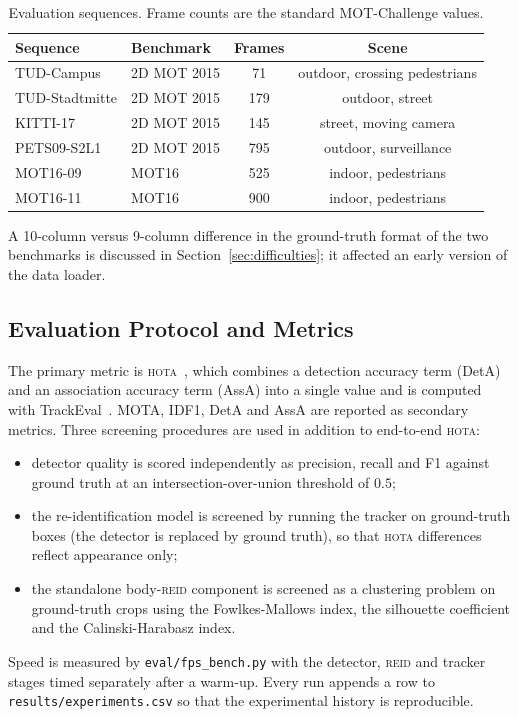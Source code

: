 \documentclass[12pt, a4paper]{article}
\newcommand{\hota}{\textsc{hota}}
\newcommand{\reid}{\textsc{reid}}
\begin{document}
\begin{table}[H]
\centering
\caption{Evaluation sequences. Frame counts are the standard MOT-Challenge values.}
\label{tab:dataset}
\begin{tabular}{llcc}
\toprule
\textbf{Sequence} & \textbf{Benchmark} & \textbf{Frames} & \textbf{Scene} \\
\midrule
TUD-Campus     & 2D MOT 2015 & 71  & outdoor, crossing pedestrians \\
TUD-Stadtmitte & 2D MOT 2015 & 179 & outdoor, street \\
KITTI-17       & 2D MOT 2015 & 145 & street, moving camera \\
PETS09-S2L1    & 2D MOT 2015 & 795 & outdoor, surveillance \\
MOT16-09       & MOT16       & 525 & indoor, pedestrians \\
MOT16-11       & MOT16       & 900 & indoor, pedestrians \\
\bottomrule
\end{tabular}
\end{table}

A 10-column versus 9-column difference in the ground-truth format of the two benchmarks is discussed
in Section~\ref{sec:difficulties}; it affected an early version of the data loader.

\subsection{Evaluation Protocol and Metrics}
\label{sec:protocol}
The primary metric is \hota{}~\cite{luiten2021hota}, which combines a detection accuracy term
(DetA) and an association accuracy term (AssA) into a single value and is computed with
TrackEval~\cite{trackeval}. MOTA, IDF1, DetA and AssA are reported as secondary metrics. Three
screening procedures are used in addition to end-to-end \hota{}:
\begin{itemize}
  \item detector quality is scored independently as precision, recall and F1 against ground truth at
        an intersection-over-union threshold of $0.5$;
  \item the re-identification model is screened by running the tracker on ground-truth boxes (the
        detector is replaced by ground truth), so that \hota{} differences reflect appearance only;
  \item the standalone body-\reid{} component is screened as a clustering problem on ground-truth
        crops using the Fowlkes-Mallows index, the silhouette coefficient and the
        Calinski-Harabasz index.
\end{itemize}
Speed is measured by \texttt{eval/fps\_bench.py} with the detector, \reid{} and tracker stages timed
separately after a warm-up. Every run appends a row to \texttt{results/experiments.csv} so that the
experimental history is reproducible.
\end{document}
